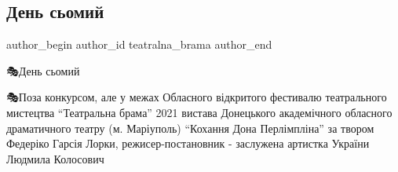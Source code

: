  
 
 
 
 

\subsection{День сьомий}
\label{sec:18_09_2021.fb.teatralna_brama.1.den_sjomyj}

\ifcmt
 author_begin
   author_id teatralna_brama
 author_end
\fi

🎭День сьомий 

🎭Поза конкурсом, але у межах Обласного відкритого фестивалю театрального
мистецтва \enquote{Театральна брама} 2021 вистава Донецького академічного обласного
драматичного театру (м. Маріуполь) \enquote{Кохання Дона Перлімпліна} за твором
Федеріко Гарсія Лорки, режисер-постановник - заслужена артистка України Людмила
Колосович
